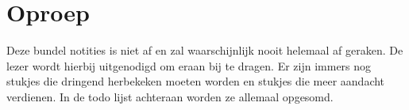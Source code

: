 \documentclass[main.tex]{subfiles}
\begin{document}
\chapter{Oproep}
\label{sec:oproep}

Deze bundel notities is niet af en zal waarschijnlijk nooit helemaal af geraken.
De lezer wordt hierbij uitgenodigd om eraan bij te dragen.
Er zijn immers nog {\Huge\hspace{5px}\hspace{5px}} stukjes die dringend herbekeken moeten worden en {\Huge\hspace{5px}\hspace{5px}} stukjes die meer aandacht verdienen.
In de todo lijst achteraan worden ze allemaal opgesomd.
\end{document}
